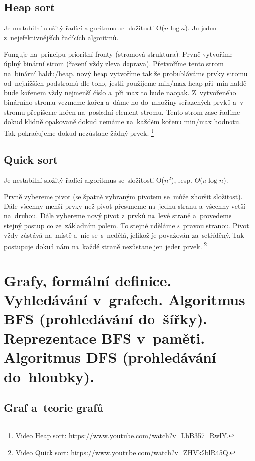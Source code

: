 \subsection{Heap sort}

Je nestabilní složitý řadící algoritmus se~složitostí O($n\log{n}$). Je jeden z~nejefektivnějších řadících algoritmů.

Funguje na~principu prioritní fronty (stromová struktura). Prvně vytvoříme úplný binární strom (řazení vždy zleva doprava). Přetvoříme tento strom na~binární haldu/heap. nový heap vytvoříme tak že probubláváme prvky stromu od~nejnižších podstromů dle toho, jestli použijeme min/max heap při~min haldě bude kořenem vždy nejmenší číslo a~při max to bude naopak. Z~vytvořeného binárního stromu vezmeme kořen a~dáme ho do~množiny seřazených prvků a~v stromu přepíšeme kořen na~poslední element stromu. Tento strom zase řadíme dokud klidně opakovaně dokud nemáme na~každém kořenu min/max hodnotu. Tak pokračujeme dokud nezůstane žádný prvek.%
\footnote{Video Heap sort: \url{https://www.youtube.com/watch?v=LbB357_RwlY}.}

\subsection{Quick sort}

Je nestabilní složitý řadící algoritmus se~složitostí O($n^2$), resp. $\Theta$($n\log{n}$).

Prvně vybereme pivot (se špatně vybraným pivotem se~může zhoršit složitost). Dále všechny menší prvky než pivot přesuneme na~jednu stranu a~všechny vetší na~druhou. Dále vybereme nový pivot z~prvků na~levé straně a~provedeme stejný postup co ze~základním polem. To stejné uděláme s~pravou stranou. Pivot vždy zůstává na~místě a~nic se~s~nedělá, jelikož je považován za~setříděný. Tak postupuje dokud nám na~každé straně nezůstane jen jeden prvek.%
\footnote{Video Quick sort: \url{https://www.youtube.com/watch?v=ZHVk2blR45Q}.}

\clearpage
\section{Grafy, formální definice. Vyhledávání v~grafech. Algoritmus BFS (prohledávání do~šířky). Reprezentace BFS v~paměti. Algoritmus DFS (prohledávání do~hloubky).}

\subsection{Graf a~teorie grafů}

